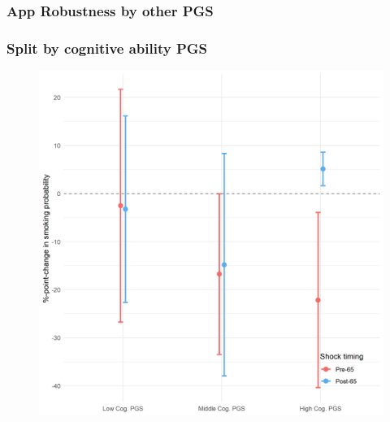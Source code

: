 \documentclass[10pt,compress,xcolor=dvipsnames,aspectratio=169]{beamer}    %
\newcounter{ex}
\newcommand{\1}[1]{\mathrm{1\hspace*{-2.5pt}l}[#1]}	%
\begin{document}
\subsubsection{App Robustness by other PGS}
\begin{frame}
\frametitle{Split by cognitive ability PGS}

\begin{figure}[hbtp]
\centering
\includegraphics[height=0.8\textheight]{../../3_output/shock_effects/robustness_cogPGS_6070_100_cvplot.png}
\label{fig:cogPGS}
\end{figure}
\hyperlink{frame:otherX}{}
\end{frame}
\end{document}
